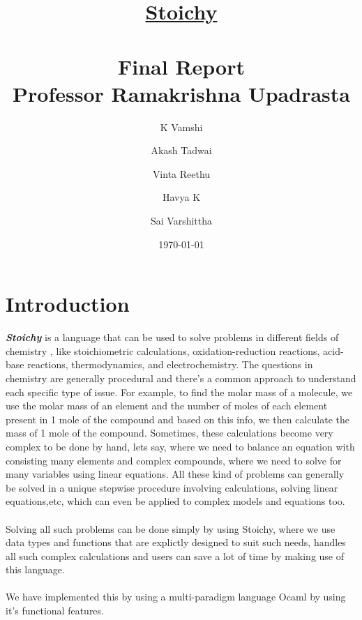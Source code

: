 \documentclass[english,a4paper,12pt]{report}
\title{\textbf{\underline{\Huge{Stoichy}}}\\~\\
\textbf{Final Report }\\ 
Professor Ramakrishna Upadrasta\\
}
\author{K Vamshi  \and  Akash Tadwai  \and Vinta Reethu \and Havya K  \and Sai Varshittha }
\date{\today}
\begin{document}
\titleformat{\chapter}[display]   
{\normalfont\huge\bfseries}{\chaptertitlename\ \thechapter}{20pt}{\Huge}   
\titlespacing*{\chapter}{0pt}{-10pt}{40pt}
\maketitle

\tableofcontents
  
\chapter*{Introduction}
     \textbf{\textit{Stoichy}} is a language that can be used to solve problems in different fields of chemistry , like stoichiometric calculations, oxidation-reduction reactions, acid-base reactions, thermodynamics, and electrochemistry. The questions in chemistry are generally procedural and there’s a common approach to understand each specific type of issue. \newline 
     For example, to find the molar mass of a molecule, we use the molar mass of an element and the number of moles of each element present in 1 mole of the compound and based on this info, we then calculate the mass of 1 mole of the compound. \vspace{1cm}
     Sometimes, these calculations become very complex to be done by hand, lets say, where we need to balance an equation with consisting many elements and complex compounds, where we need to solve for many variables using linear equations. All these kind of problems can generally be solved in a unique stepwise procedure involving calculations, solving linear equations,etc, which can even be applied to complex models and equations too.\\\\
    Solving all such problems can be done simply by using Stoichy, where we use data types and functions that are explictly designed to suit such needs, handles all such complex calculations and users can save a lot of time by making use of this language. \\\\We have implemented this by using a multi-paradigm   language Ocaml by using it's functional features. 
\newpage
\end{document}
